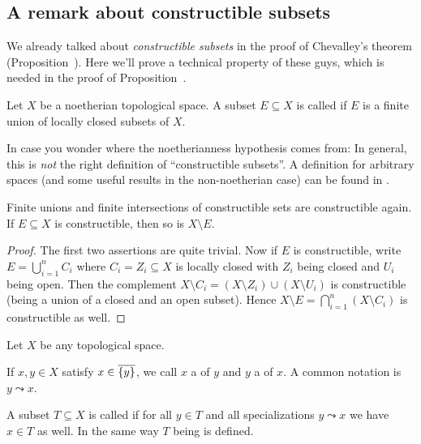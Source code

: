 \documentclass[a4paper,parskip=half,numbers=enddot, DIV=12]{scrreprt}
\begin{document}
\subsection{A remark about constructible subsets}
We already talked about \emph{constructible subsets} in the proof of Chevalley's theorem (Proposition~). Here we'll prove a technical property of these guys, which is needed in the proof of Proposition~.
\begin{defi}
	Let $X$ be a noetherian topological space. A subset $E\subseteq X$ is called  if $E$ is a finite union of locally closed subsets of $X$.
\end{defi}
	In case you wonder where the noetherianness hypothesis comes from: In general, this is \emph{not} the right definition of ``constructible subsets''. A definition for arbitrary spaces (and some useful results in the non-noetherian case) can be found in \cite[]{stacks-project}.
\begin{lem}
	Finite unions and finite intersections of constructible sets are constructible again. If $E\subseteq X$ is constructible, then so is $X\setminus E$.
\end{lem}
\begin{proof}
	The first two assertions are quite trivial. Now if $E$ is constructible, write $E=\bigcup_{i=1}^nC_i$ where $C_i=Z_i\subseteq X$ is locally closed with $Z_i$ being closed and $U_i$ being open. Then the complement $X\setminus C_i=(X\setminus Z_i)\cup (X\setminus U_i)$ is constructible (being a union of a closed and an open subset). Hence $X\setminus E=\bigcap_{i=1}^n(X\setminus C_i)$ is constructible as well.
\end{proof}
\begin{defi}
	Let $X$ be any topological space.
	\begin{alphanumerate}
		\item If $x,y\in X$ satisfy $x\in\overline{\{y\}}$, we call $x$ a  of $y$ and $y$ a  of $x$. A common notation is $y\leadsto x$.
		\item A subset $T\subseteq X$ is called  if for all $y\in T$ and all specializations $y\leadsto x$ we have $x\in T$ as well. In the same way $T$ being  is defined.
	\end{alphanumerate}
\end{defi}
\end{document}
